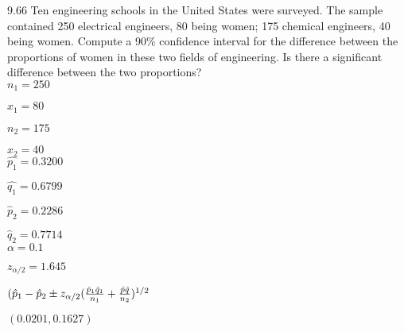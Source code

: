 9.66 Ten engineering schools in the United States were surveyed. The sample contained 250 electrical engineers, 80 being women; 175 chemical engineers, 40 being women. Compute a 90\% confidence interval for the difference between the proportions of women in these two fields of engineering. Is there a significant difference between the two proportions? \\

$n_1 = 250$

$x_1 = 80$

$n_2 = 175$

$x_2 = 40$ \\

$\hat{p_1} = 0.3200$

$\hat{q_1} = 0.6799$

$\hat{p}_2 = 0.2286$

$\hat{q}_2 = 0.7714$ \\

$\alpha = 0.1$

$z_{\alpha/2} = 1.645$

$(\hat{p}_1 - \hat{p}_2 \pm z_{\alpha/2} (\frac{\hat{p}_1 \hat{q}_1}{n_1} + \frac{\hat{p} \hat{q}}{n_2})^{1/2}$

$(0.0201, 0.1627)$


